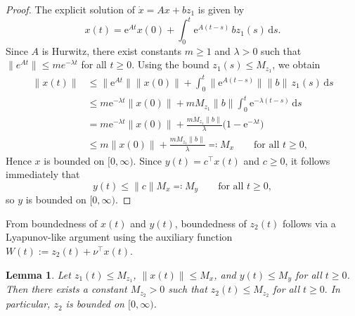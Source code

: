 \documentclass{article}
\newtheorem{lemma}{Lemma}
\newcommand{\e}{\mbox{e}}
\begin{document}
\begin{proof}
    The explicit solution of $\dot x = Ax + bz_1$ is given by
    \begin{equation*}
        x(t) = \e^{At}x(0) + \int_0^t \e^{A(t-s)}\,bz_1(s)\,\mbox{d}s.
    \end{equation*}
    Since $A$ is Hurwitz, there exist constants $m \ge 1$ and $\lambda > 0$ 
    such that $\|e^{At}\| \le m e^{-\lambda t}$ for all $t \ge 0$. Using the bound
    $z_1(s) \le M_{z_1}$, we obtain
    \begin{align*}
        \|x(t)\| 
        &\le \|\e^{At}\|\|x(0)\| 
         + \int_0^t \|\e^{A(t-s)}\|\|b\|\,z_1(s)\,\mbox{d}s \\
        &\le m\e^{-\lambda t}\|x(0)\| 
         + mM_{z_1}\|b\|\int_0^t \e^{-\lambda(t-s)}\,\mbox{d}s \\
        &= m\e^{-\lambda t}\|x(0)\| 
         + \frac{mM_{z_1}\|b\|}{\lambda}\bigl(1-\e^{-\lambda t}\bigr)\\
        &\le m\|x(0)\| + \frac{mM_{z_1}\|b\|}{\lambda}\eqqcolon M_x 
        \qquad\text{for all } t\ge 0,
    \end{align*}
    Hence $x$ is bounded on $[0,\infty)$. Since $y(t)=c^\top x(t)$ and $c\ge 0$, it follows 
    immediately that
    \begin{equation*}
        y(t) \le \|c\| M_x \eqqcolon M_y \qquad\text{for all } t \ge 0,
    \end{equation*}
    so $y$ is bounded on $[0,\infty)$.
\end{proof}

From boundedness of $x(t)$ and $y(t)$, boundedness of $z_2(t)$ follows 
via a Lyapunov-like argument using the auxiliary function 
$W(t):=z_2(t)+\nu^\top x(t)$.

\begin{lemma}\label{lem:z2_bounded}
    Let $z_1(t)\le M_{z_1}$, $\|x(t)\|\le M_x$, and $y(t)\le M_y$ for all 
    $t\ge 0$. Then there exists a constant $M_{z_2}>0$ such that $z_2(t) \le M_{z_2}$ for all $t\ge 0.$
    In particular, $z_2$ is bounded on $[0,\infty)$.
\end{lemma}
\end{document}
